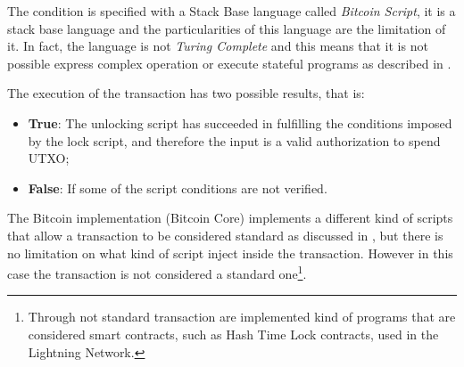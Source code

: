The condition is specified with a Stack Base language called \emph{Bitcoin Script},
it is a stack base language and the particularities of this language are the
limitation of it. 
In fact, the language is not \emph{Turing Complete} and this means that it is 
not possible express complex operation or execute stateful programs as described 
in \cite{Palazzo_Estrazione_di_Informazioni_2021}.

The execution of the transaction has two possible results, that is: 

\begin{itemize}
    \item {\bf True}: The unlocking script has succeeded in fulfilling the 
        conditions imposed by the lock script, 
        and therefore the input is a valid authorization to spend UTXO;
    \item {\bf False}: If some of the script conditions are not verified.
\end{itemize}

The Bitcoin implementation (Bitcoin Core) implements a different kind of scripts
that allow a transaction to be considered standard as discussed 
in \cite{Palazzo_Estrazione_di_Informazioni_2021},
but there is no limitation on what kind of script inject inside the transaction. 
However in this case the transaction is not considered a standard one\footnote{Through not standard transaction are 
implemented kind of programs that are considered smart contracts, such as Hash Time Lock contracts, 
used in the Lightning Network.}.

